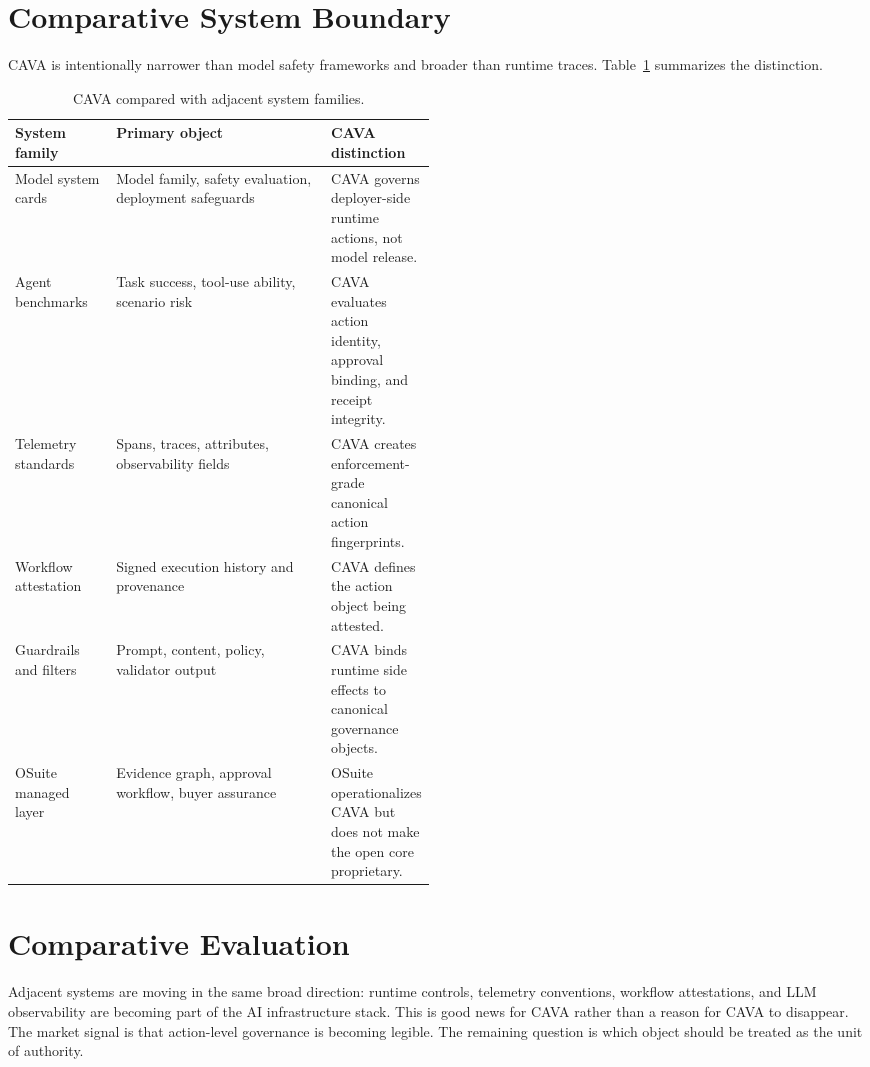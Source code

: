 \documentclass[11pt]{article}
\begin{document}
\section{Comparative System Boundary}

CAVA is intentionally narrower than model safety frameworks and broader than runtime traces. Table~\ref{tab:comparative-boundary} summarizes the distinction.

\begin{table}[h]
\centering
\small
\caption{CAVA compared with adjacent system families.}
\label{tab:comparative-boundary}
\begin{tabularx}{\linewidth}{@{}>{\raggedright\arraybackslash}p{0.24\linewidth}X>{\raggedright\arraybackslash}p{0.25\linewidth}@{}}
\toprule
System family & Primary object & CAVA distinction \\
\midrule
Model system cards & Model family, safety evaluation, deployment safeguards & CAVA governs deployer-side runtime actions, not model release. \\
Agent benchmarks & Task success, tool-use ability, scenario risk & CAVA evaluates action identity, approval binding, and receipt integrity. \\
Telemetry standards & Spans, traces, attributes, observability fields & CAVA creates enforcement-grade canonical action fingerprints. \\
Workflow attestation & Signed execution history and provenance & CAVA defines the action object being attested. \\
Guardrails and filters & Prompt, content, policy, validator output & CAVA binds runtime side effects to canonical governance objects. \\
OSuite managed layer & Evidence graph, approval workflow, buyer assurance & OSuite operationalizes CAVA but does not make the open core proprietary. \\
\bottomrule
\end{tabularx}
\end{table}

\section{Comparative Evaluation}

Adjacent systems are moving in the same broad direction: runtime controls, telemetry conventions, workflow attestations, and LLM observability are becoming part of the AI infrastructure stack. This is good news for CAVA rather than a reason for CAVA to disappear. The market signal is that action-level governance is becoming legible. The remaining question is which object should be treated as the unit of authority.
\end{document}
